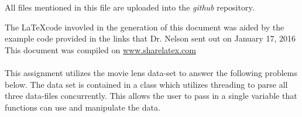 \documentclass[12pt,letterpaper]{article}
\begin{document}
All files mentioned in this file are uploaded into the {\it github} repository.

The \LaTeX code invovled in the generation of this document was aided by the example code provided in the links that Dr. Nelson sent out on January 17, 2016 \\ %

This document was compiled on \url{www.sharelatex.com} \\ \\ 

This assignment utilizes the movie lens data-set to answer the following problems below\cite{grouplens2016,fmaxwellharperjosephakonstan2015}. The data set is contained in a class which utilizes threading to parse all three data-files concurrently. This allows the user to pass in a single variable that functions can use and manipulate the data. 
\end{document}
